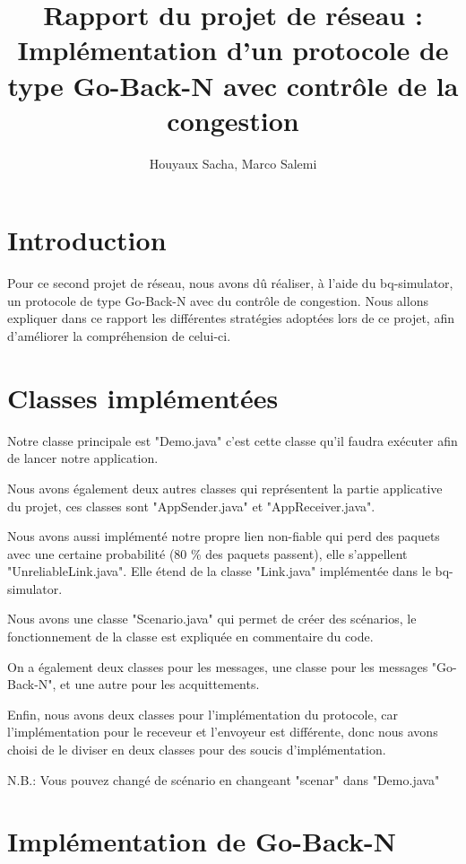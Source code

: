 \documentclass[11pt,a4paper]{article}
\author{Houyaux Sacha, Marco Salemi}
\title{Rapport du projet de réseau : Implémentation d'un protocole de type Go-Back-N avec contrôle de la congestion}
\begin{document}
\maketitle

\section{Introduction}

	Pour ce second projet de réseau, nous avons dû réaliser, à l'aide du bq-simulator, un protocole de type Go-Back-N avec du contrôle de congestion. Nous allons expliquer dans ce rapport les différentes stratégies adoptées lors de ce projet, afin d'améliorer la compréhension de celui-ci.
	
\section{Classes implémentées}

	Notre classe principale est "Demo.java" c'est cette classe qu'il faudra exécuter afin de lancer notre application.
	
	Nous avons également deux autres classes qui représentent la partie applicative du projet, ces classes sont "AppSender.java" et "AppReceiver.java".
	
	Nous avons aussi implémenté notre propre lien non-fiable qui perd des paquets avec une certaine probabilité (80 \% des paquets passent), elle s'appellent "UnreliableLink.java". Elle étend de la classe "Link.java" implémentée dans le bq-simulator.

	Nous avons une classe "Scenario.java" qui permet de créer des scénarios, le fonctionnement de la classe est expliquée en commentaire du code.
	
	On a également deux classes pour les messages, une classe pour les messages "Go-Back-N", et une autre pour les acquittements.
	
	Enfin, nous avons deux classes pour l'implémentation du protocole, car l'implémentation pour le receveur et l'envoyeur est différente, donc nous avons choisi de le diviser en deux classes pour des soucis d'implémentation.
	
	N.B.: Vous pouvez changé de scénario en changeant "scenar" dans "Demo.java"

\newpage

\section{Implémentation de Go-Back-N}
\end{document}
